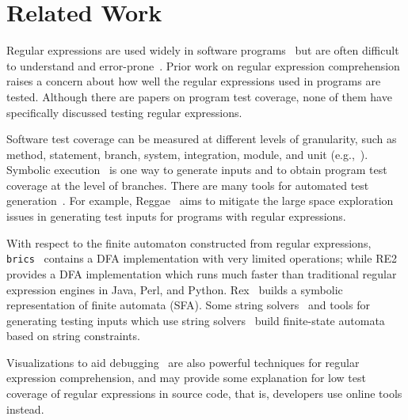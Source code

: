 \section{Related Work}
\label{sec:related}
Regular expressions are used widely in software programs~\cite{chapman2016} but are often difficult to understand and error-prone~\cite{chapman2017exploring}. Prior work on regular expression comprehension~\cite{chapman2017exploring} raises a concern about how well the regular expressions used in programs are tested. Although there are papers on program test coverage, none of them have specifically discussed testing regular expressions.

Software test coverage can be measured at different levels of granularity, such as method, statement, branch, system, integration, module, and unit (e.g.,~\cite{malaiya2002software, ammann2016introduction, zhu1997software,li2009experimental,piwowarski1993coverage}). Symbolic execution~\cite{klee,jpf,xie2005symstra,bucur2011parallel} is one way to generate inputs and to obtain program test coverage at the level of branches. There are many tools for automated test generation~\cite{zhang2011combined,fraser2013does,pacheco2007randoop}. For example, Reggae~\cite{li2009reggae} aims to mitigate the large space exploration issues in generating test inputs for programs with regular expressions. %

With respect to the finite automaton constructed from regular expressions, {\tt brics}~\cite{brics} contains a DFA implementation with very limited operations; while RE2~\cite{cox2007regular,re2} provides a DFA implementation which runs much faster than traditional regular expression engines in Java, Perl, and Python. Rex~\cite{rex} builds a symbolic representation of finite automata (SFA). Some string solvers~\cite{kiezun2009hampi} and tools for generating testing inputs which use string solvers~\cite{wassermann2008dynamic,Ghosh:2013:JAT:2486788.2486925} build finite-state automata based on string constraints.

Visualizations to aid debugging~\cite{beck2014regviz,regex101} are also powerful techniques for regular expression comprehension, and may provide some explanation for low test coverage of regular expressions in source code, that is, developers use online tools instead. 

